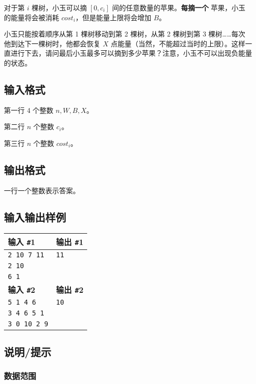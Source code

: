 \documentclass{article}
\begin{document}
	对于第 $i$ 棵树，小玉可以摘 $[0,c_{i}]$ 间的任意数量的苹果。\textbf{每摘一个} 苹果，小玉的能量将会被消耗 $cost_{i}$，但是能量上限将会增加 $B$。

	小玉只能按着顺序从第 1 棵树移动到第 2 棵树，从第 2 棵树到第 3 棵树……每次他到达下一棵树时，他都会恢复 $X$ 点能量（当然，不能超过当时的上限）。这样一直进行下去，请问最后小玉最多可以摘到多少苹果？注意，小玉不可以出现负能量的状态。

	\subsection{输入格式}

	第一行 4 个整数 $n,W,B,X$。

	第二行 $n$ 个整数 $c_{i}$。

	第三行 $n$ 个整数 $cost_{i}$。

	\subsection{输出格式}

	一行一个整数表示答案。

	\subsection{输入输出样例}

	\begin{tabularx}{\textwidth}{|X|X|}
		\hline
		\textbf{输入 \texttt{\#}1} & \textbf{输出 \texttt{\#}1} \\
		\hline
		\texttt{2 10 7 11} & \texttt{11} \\
		\texttt{2 10} & \\
		\texttt{6 1} & \\
		\hline
		\textbf{输入 \texttt{\#}2} & \textbf{输出 \texttt{\#}2} \\
		\hline
		\texttt{5 1 4 6} & \texttt{10} \\ 
		\texttt{3 4 6 5 1} & \\
		\texttt{3 0 10 2 9} & \\
		\hline
	\end{tabularx}

	\subsection{说明/提示}

	\subsubsection{数据范围}
\end{document}
